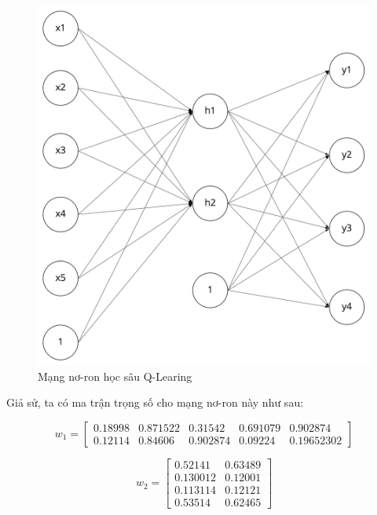 \begin{figure}[ht!]
    \centering
    \includegraphics[scale=0.15]{thesis/chatbot/kienthuc/img/neural_network.jpg}
    \caption{Mạng nơ-ron học sâu Q-Learing}
    \label{fig:examnetwork}
\end{figure}

Giả sử, ta có ma trận trọng số cho mạng nơ-ron này như sau:

\begin{equation*}
    w_1 =
    \begin{bmatrix}
        0.18998 & 0.871522 & 0.31542 & 0.691079 & 0.902874 \\
        0.12114 & 0.84606 & 0.902874 & 0.09224 & 0.19652302
    \end{bmatrix}
\end{equation*}

\begin{equation*}
    w_2 =
    \begin{bmatrix}
        0.52141 & 0.63489 \\
        0.130012 & 0.12001 \\
        0.113114 & 0.12121 \\
        0.53514 & 0.62465
    \end{bmatrix}
\end{equation*}

